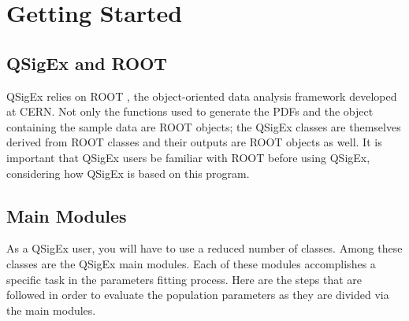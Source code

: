 \chapter{Getting Started}

\section{QSigEx and ROOT}
QSigEx relies on ROOT \cite{root}, the object-oriented data analysis framework developed at CERN.
Not only the functions used to generate the PDFs and the object containing the sample data are ROOT objects; the QSigEx classes are themselves derived from ROOT classes and their outputs are ROOT objects as well.
It is important that QSigEx users be familiar with ROOT before using QSigEx, considering how QSigEx is based on this program.

\section{Main Modules} \label{gs:mm}
As a QSigEx user, you will have to use a reduced number of classes.
Among these classes are the QSigEx main modules.
Each of these modules accomplishes a specific task in the parameters fitting process.
Here are the steps that are followed in order to evaluate the population parameters as they are divided via the main modules.

